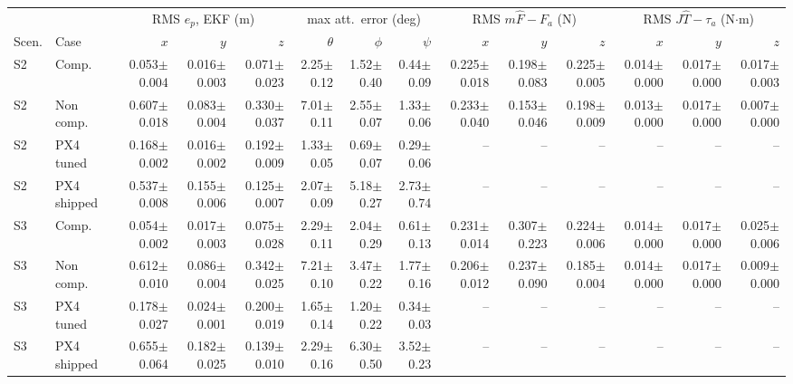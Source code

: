 \begin{tabular}{llrrrrrrrrrrrr}
\toprule
 & & \multicolumn{3}{c}{RMS $e_p$, EKF (m)} & \multicolumn{3}{c}{max att.\ error (deg)} & \multicolumn{3}{c}{RMS $m\hat F - F_a$ (N)} & \multicolumn{3}{c}{RMS $J\hat T - \tau_a$ (N$\cdot$m)} \\
\cmidrule(lr){3-5}\cmidrule(lr){6-8}\cmidrule(lr){9-11}\cmidrule(lr){12-14}
Scen. & Case & $x$ & $y$ & $z$ & $\theta$ & $\phi$ & $\psi$ & $x$ & $y$ & $z$ & $x$ & $y$ & $z$ \\
\midrule
S2 & Comp. & 0.053$\pm$0.004 & 0.016$\pm$0.003 & 0.071$\pm$0.023 & 2.25$\pm$0.12 & 1.52$\pm$0.40 & 0.44$\pm$0.09 & 0.225$\pm$0.018 & 0.198$\pm$0.083 & 0.225$\pm$0.005 & 0.014$\pm$0.000 & 0.017$\pm$0.000 & 0.017$\pm$0.003 \\
S2 & Non comp. & 0.607$\pm$0.018 & 0.083$\pm$0.004 & 0.330$\pm$0.037 & 7.01$\pm$0.11 & 2.55$\pm$0.07 & 1.33$\pm$0.06 & 0.233$\pm$0.040 & 0.153$\pm$0.046 & 0.198$\pm$0.009 & 0.013$\pm$0.000 & 0.017$\pm$0.000 & 0.007$\pm$0.000 \\
S2 & PX4 tuned & 0.168$\pm$0.002 & 0.016$\pm$0.002 & 0.192$\pm$0.009 & 1.33$\pm$0.05 & 0.69$\pm$0.07 & 0.29$\pm$0.06 & -- & -- & -- & -- & -- & -- \\
S2 & PX4 shipped & 0.537$\pm$0.008 & 0.155$\pm$0.006 & 0.125$\pm$0.007 & 2.07$\pm$0.09 & 5.18$\pm$0.27 & 2.73$\pm$0.74 & -- & -- & -- & -- & -- & -- \\
S3 & Comp. & 0.054$\pm$0.002 & 0.017$\pm$0.003 & 0.075$\pm$0.028 & 2.29$\pm$0.11 & 2.04$\pm$0.29 & 0.61$\pm$0.13 & 0.231$\pm$0.014 & 0.307$\pm$0.223 & 0.224$\pm$0.006 & 0.014$\pm$0.000 & 0.017$\pm$0.000 & 0.025$\pm$0.006 \\
S3 & Non comp. & 0.612$\pm$0.010 & 0.086$\pm$0.004 & 0.342$\pm$0.025 & 7.21$\pm$0.10 & 3.47$\pm$0.22 & 1.77$\pm$0.16 & 0.206$\pm$0.012 & 0.237$\pm$0.090 & 0.185$\pm$0.004 & 0.014$\pm$0.000 & 0.017$\pm$0.000 & 0.009$\pm$0.000 \\
S3 & PX4 tuned & 0.178$\pm$0.027 & 0.024$\pm$0.001 & 0.200$\pm$0.019 & 1.65$\pm$0.14 & 1.20$\pm$0.22 & 0.34$\pm$0.03 & -- & -- & -- & -- & -- & -- \\
S3 & PX4 shipped & 0.655$\pm$0.064 & 0.182$\pm$0.025 & 0.139$\pm$0.010 & 2.29$\pm$0.16 & 6.30$\pm$0.50 & 3.52$\pm$0.23 & -- & -- & -- & -- & -- & -- \\
\bottomrule
\end{tabular}
